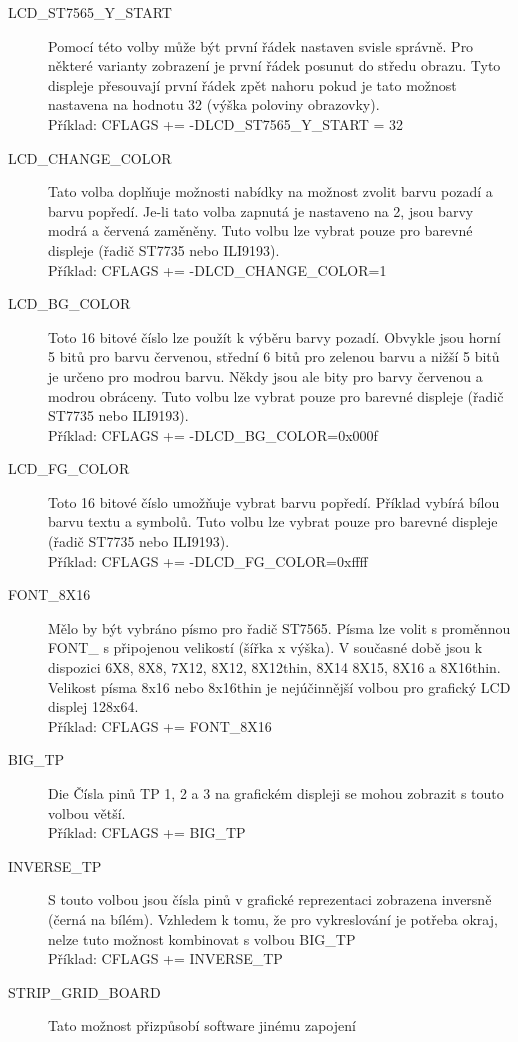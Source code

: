 \begin{description}
\item[LCD\_ST7565\_Y\_START] Pomocí této volby může být první řádek nastaven svisle správně.
Pro některé varianty zobrazení je první řádek posunut do středu obrazu.
Tyto displeje přesouvají první řádek zpět nahoru
pokud je tato možnost nastavena na hodnotu 32 (výška poloviny obrazovky).\\
Příklad: CFLAGS += -DLCD\_ST7565\_Y\_START = 32
\item[LCD\_CHANGE\_COLOR]  Tato volba doplňuje možnosti nabídky na možnost
zvolit barvu pozadí a barvu popředí.
Je-li tato volba zapnutá je nastaveno na 2, jsou barvy modrá a červená zaměněny.
Tuto volbu lze vybrat pouze pro barevné displeje (řadič ST7735 nebo ILI9193).\\
Příklad: CFLAGS += -DLCD\_CHANGE\_COLOR=1
 \item[LCD\_BG\_COLOR] Toto 16 bitové číslo lze použít k výběru barvy pozadí.
Obvykle jsou horní 5 bitů pro barvu červenou, střední 6 bitů pro zelenou barvu
a nižší 5 bitů je určeno pro modrou barvu.
Někdy jsou ale bity pro barvy červenou a modrou obráceny.
Tuto volbu lze vybrat pouze pro barevné displeje (řadič ST7735 nebo ILI9193).\\
Příklad: CFLAGS += -DLCD\_BG\_COLOR=0x000f
 \item[LCD\_FG\_COLOR] Toto 16 bitové číslo umožňuje vybrat barvu popředí.
Příklad vybírá bílou barvu textu a symbolů.
Tuto volbu lze vybrat pouze pro barevné displeje (řadič ST7735 nebo ILI9193).\\
Příklad: CFLAGS += -DLCD\_FG\_COLOR=0xffff
  \item[FONT\_8X16] Mělo by být vybráno písmo pro řadič ST7565.
Písma lze volit s proměnnou FONT\_ s připojenou velikostí (šířka x výška).
V současné době jsou k dispozici 6X8, 8X8, 7X12, 8X12, 8X12thin, 8X14 8X15, 8X16 a 8X16thin.
Velikost písma 8x16 nebo 8x16thin je nejúčinnější volbou pro grafický LCD displej 128x64.\\
Příklad: CFLAGS += FONT\_8X16
 \item[BIG\_TP] Die Čísla pinů TP 1, 2 a 3 na grafickém displeji se mohou zobrazit s touto volbou větší.\\
Příklad: CFLAGS += BIG\_TP
 \item[INVERSE\_TP] S touto volbou jsou čísla pinů v grafické reprezentaci zobrazena inversně (černá na bílém).
Vzhledem k tomu, že pro vykreslování je potřeba okraj, nelze tuto možnost kombinovat s volbou BIG\_TP\\
Příklad: CFLAGS += INVERSE\_TP
  \item[STRIP\_GRID\_BOARD] Tato možnost přizpůsobí software jinému zapojení

\end{description}
